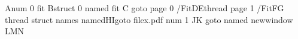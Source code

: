 \documentclass{article}
\begin{document}
A\pdfdest num 0 fit B\pdfdest struct 0 name{d} fit C%
\pdfstartlink goto page 0 {/Fit}D\pdfendlink E\pdfstartlink thread page 1 {/Fit}F\pdfendlink G%
\pdfstartlink thread struct name{s} name{d}H\pdfendlink I\pdfstartlink goto file{x.pdf} num 1 J\pdfendlink K%
\pdfstartlink goto name{d} newwindow L\pdfendlink M\relax N
\end{document}

